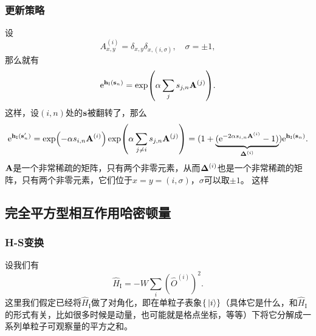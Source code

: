 \documentclass[hyperref, UTF8, a4paper]{ctexart}
\newcommand*{\ee}{\mathrm{e}}
\begin{document}
\subsubsection{更新策略}

设
\begin{equation}
    A_{x, y}^{(i)} = \delta_{x, y} \delta_{x, (i, \sigma)}, \quad \sigma = \pm 1,
\end{equation}
那么就有
\[
    \ee^{\vb{h}_\text{I}(\vb{s}_n)} = \exp(\alpha \sum_j s_{j, n} \vb{A}^{(j)}).
\]
这样，设$(i, n)$处的$\vb{s}$被翻转了，那么
\begin{equation}
    \ee^{\vb{h}_\text{I}(\vb{s}_n')} = \exp(-\alpha s_{i, n} \vb{A}^{(i)}) \exp(\alpha \sum_{j \neq i} s_{j, n} \vb{A}^{(j)}) = ( 1 + \underbrace{( \ee^{-2 \alpha s_{i, n} \vb{A}^{(i)}} - 1)}_{\vb{\Delta}^{(i)}} ) \ee^{\vb{h}_\text{I}(\vb{s}_n)} .
\end{equation}
$\vb{A}$是一个非常稀疏的矩阵，只有两个非零元素，从而$\vb{\Delta}^{(i)}$也是一个非常稀疏的矩阵，只有两个非零元素，它们位于$x=y=(i, \sigma)$，$\sigma$可以取$\pm 1$。
这样

\subsection{完全平方型相互作用哈密顿量}

\subsubsection{H-S变换}

设我们有
\begin{equation}
    \hat{H}_\text{I} = - W \sum_{i} \left( \hat{O}^{(i)} \right)^2.
    \label{eq:two-fermions-hamiltonian}
\end{equation}
这里我们假定已经将$\hat{H}_\text{I}$做了对角化，即在单粒子表象$\{\ket*{i}\}$（具体它是什么，和$\hat{H}_\text{I}$的形式有关，比如很多时候是动量，也可能就是格点坐标，等等）下将它分解成一系列单粒子可观察量的平方之和。
\end{document}
